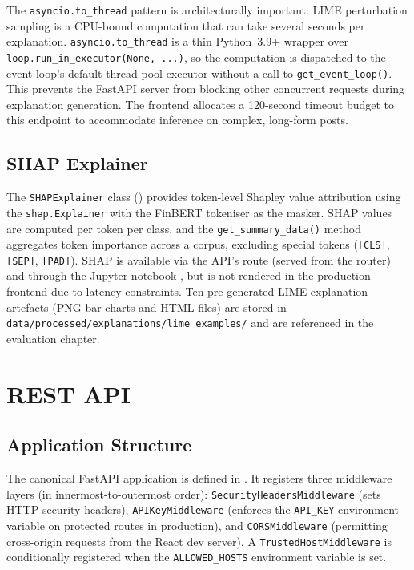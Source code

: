 The \texttt{asyncio.to\_thread} pattern is architecturally important: LIME perturbation sampling is a CPU-bound computation that can take several seconds per explanation. \texttt{asyncio.to\_thread} is a thin Python~3.9+ wrapper over \texttt{loop.run\_in\_executor(None, ...)}, so the computation is dispatched to the event loop's default thread-pool executor without a call to \texttt{get\_event\_loop()}. This prevents the FastAPI server from blocking other concurrent requests during explanation generation.  The frontend allocates a 120-second timeout budget to this endpoint to accommodate inference on complex, long-form posts.

\subsection{SHAP Explainer}

The \texttt{SHAPExplainer} class () provides token-level Shapley value attribution using the \texttt{shap.Explainer} with the FinBERT tokeniser as the masker.  SHAP values are computed per token per class, and the \texttt{get\_summary\_data()} method aggregates token importance across a corpus, excluding special tokens (\texttt{[CLS]}, \texttt{[SEP]}, \texttt{[PAD]}).  SHAP is available via the API's  route (served from the  router) and through the Jupyter notebook , but is not rendered in the production frontend due to latency constraints.  Ten pre-generated LIME explanation artefacts (PNG bar charts and HTML files) are stored in \texttt{data/processed/explanations/lime\_examples/} and are referenced in the evaluation chapter.

\section{REST API}
\label{sec:api_impl}

\subsection{Application Structure}

The canonical FastAPI application is defined in .  It registers three middleware layers (in innermost-to-outermost order): \texttt{SecurityHeadersMiddleware} (sets HTTP security headers), \texttt{APIKeyMiddleware} (enforces the \texttt{API\_KEY} environment variable on protected routes in production), and \texttt{CORSMiddleware} (permitting cross-origin requests from the React dev server).  A \texttt{TrustedHostMiddleware} is conditionally registered when the \texttt{ALLOWED\_HOSTS} environment variable is set.

